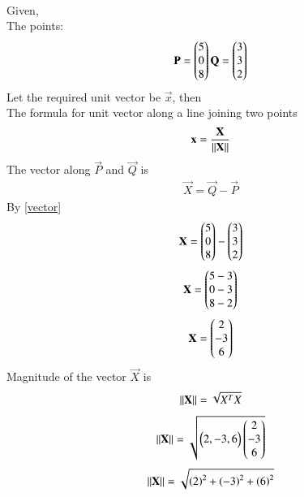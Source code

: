 \documentclass[journal]{IEEEtran}
\begin{document}
         \solution \\
         Given,\\
         The points: 
         \begin{align}
             \mathbf{P}=\begin{pmatrix}5\\0\\8\end{pmatrix} \mathbf{Q}=\begin{pmatrix}3\\3\\2\end{pmatrix}
         \end{align}
         Let the required unit vector be $\vec{x}$, then\\ 
         The formula for unit vector along a line joining two points
         \begin{align}
             \mathbf{{x}}=\frac{\mathbf{X}}{\left\lVert\mathbf{X}\right\rVert} \label{unit}
         \end{align}
         The vector along $\vec{P}$ and $\vec{Q}$ is\\
         \begin{align}
             \vec{X}=\vec{Q}-\vec{P} \label{vector}
         \end{align}
         By \eqref{vector}
         \begin{align}
             \mathbf{X}=\begin{pmatrix}5\\0\\8\end{pmatrix}-\begin{pmatrix}3\\3\\2\end{pmatrix}
         \end{align}
         \begin{align}
             \mathbf{X}=\begin{pmatrix}5-3\\0-3\\8-2\end{pmatrix}
         \end{align}
         \begin{align}
             \mathbf{X}=\begin{pmatrix}2\\-3\\6\end{pmatrix}
         \end{align}
         Magnitude of the vector $\vec{X}$ is\\
         \begin{align}
             \left\lVert\mathbf{X}\right\rVert=\sqrt{X^T X}
         \end{align}
         \begin{align}
             \left\lVert\mathbf{X}\right\rVert=\sqrt{\begin{pmatrix}2,-3,6\end{pmatrix}\begin{pmatrix}2\\-3\\6\end{pmatrix}}
         \end{align}
         \begin{align}
             \left\lVert\mathbf{X}\right\rVert=\sqrt{\left(2\right)^2+\left(-3\right)^2+\left(6\right)^2}
         \end{align}
\end{document}
